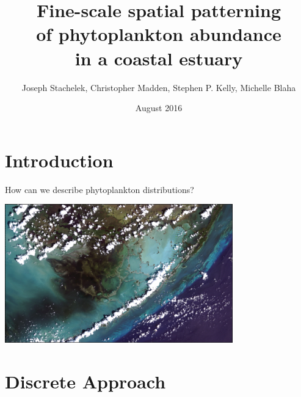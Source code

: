\documentclass[compress,noflama,nosectionpages]{beamer}
\title{\nohyphens{Fine-scale spatial patterning \protect\\ of phytoplankton abundance \protect\\ in a coastal estuary}}
\subtitle{\nohyphens{ }}
\date{August 2016}
\author{{\Medium Joseph Stachelek}, Christopher Madden, Stephen P. Kelly, Michelle Blaha}
\institute{{\Medium Michigan State University} South Florida Water Management District}
\begin{document}

\maketitle



\section{Introduction}


\begin{frame}{How can we describe phytoplankton distributions?}

	\begin{centering}
		\includegraphics[height=6cm,keepaspectratio=true]{images/landsat_border.jpg}\\
	\end{centering}

\end{frame}

\section{Discrete Approach}
\end{document}
